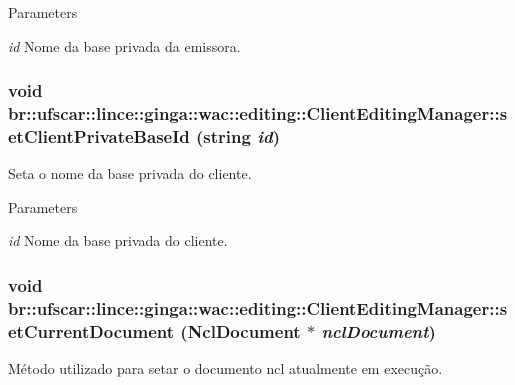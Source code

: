 \begin{DoxyParams}{Parameters}
\item[{\em id}]Nome da base privada da emissora. \end{DoxyParams}
\hypertarget{classbr_1_1ufscar_1_1lince_1_1ginga_1_1wac_1_1editing_1_1ClientEditingManager_a6a57699073fe086e75d16ffd96a5bfc3}{
\subsubsection[{setClientPrivateBaseId}]{\setlength{\rightskip}{0pt plus 5cm}void br::ufscar::lince::ginga::wac::editing::ClientEditingManager::setClientPrivateBaseId (string {\em id})}}
\label{classbr_1_1ufscar_1_1lince_1_1ginga_1_1wac_1_1editing_1_1ClientEditingManager_a6a57699073fe086e75d16ffd96a5bfc3}


Seta o nome da base privada do cliente. 


\begin{DoxyParams}{Parameters}
\item[{\em id}]Nome da base privada do cliente. \end{DoxyParams}
\hypertarget{classbr_1_1ufscar_1_1lince_1_1ginga_1_1wac_1_1editing_1_1ClientEditingManager_af64ee7af65344bf8c0eba75c33a9e29c}{
\subsubsection[{setCurrentDocument}]{\setlength{\rightskip}{0pt plus 5cm}void br::ufscar::lince::ginga::wac::editing::ClientEditingManager::setCurrentDocument (NclDocument $\ast$ {\em nclDocument})}}
\label{classbr_1_1ufscar_1_1lince_1_1ginga_1_1wac_1_1editing_1_1ClientEditingManager_af64ee7af65344bf8c0eba75c33a9e29c}


Método utilizado para setar o documento ncl atualmente em execução. 



